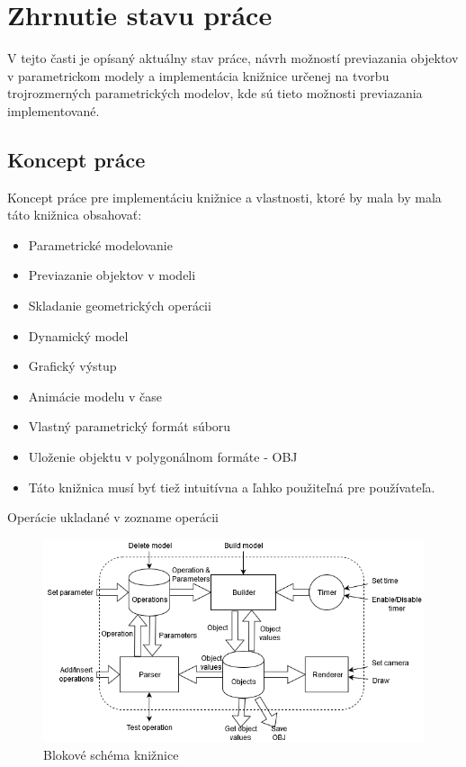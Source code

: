 \chapter{Zhrnutie stavu práce}
V tejto časti je opísaný aktuálny stav práce, návrh možností previazania objektov v parametrickom modely a implementácia knižnice určenej na tvorbu trojrozmerných parametrických modelov, kde sú tieto možnosti previazania implementované.  

\section{Koncept práce}

Koncept práce pre implementáciu knižnice a vlastnosti, ktoré by mala by mala táto knižnica obsahovať:
\begin{itemize}
\item Parametrické modelovanie
\item Previazanie objektov v modeli
\item Skladanie geometrických operácii
\item Dynamický model
\item Grafický výstup
\item Animácie modelu v čase
\item Vlastný parametrický formát súboru
\item Uloženie objektu v polygonálnom formáte - OBJ
\item Táto knižnica musí byť tiež intuitívna a ľahko použiteľná pre používateľa.
\end{itemize}



Operácie ukladané v zozname operácii




\begin{figure}[hbt]
	\centering
	\includegraphics[width=1\textwidth]{obrazky-figures/Diagram.png}
	\caption{Blokové schéma knižnice }
	\label{fig:blockDiagram}
\end{figure}





